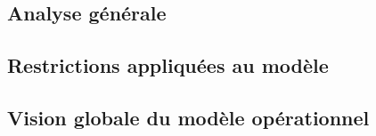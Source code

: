 \subsection{Analyse générale}


\subsection{Restrictions appliquées au modèle}


\subsection{Vision globale du modèle opérationnel}
